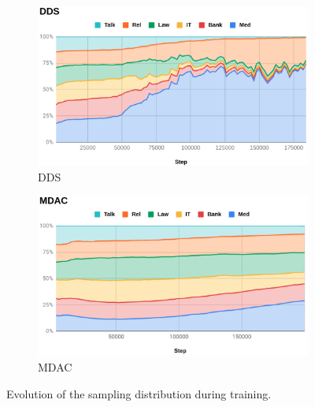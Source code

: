 \documentclass[11pt]{article}
\begin{document}
\begin{figure}[htbp]
\begin{subfigure}{.5\textwidth}
  \centering
  \includegraphics[width=.8\linewidth]{DDS.png}  
  \caption{DDS}
  \label{fig:DDS}
\end{subfigure}
\begin{subfigure}{.5\textwidth}
  \centering
  \includegraphics[width=.8\linewidth]{MDAC.png}  
  \caption{MDAC}
  \label{fig:MDAC}
\end{subfigure}
\caption{Evolution of the sampling distribution during training.}
\label{fig:sampling}
\end{figure}
\end{document}
